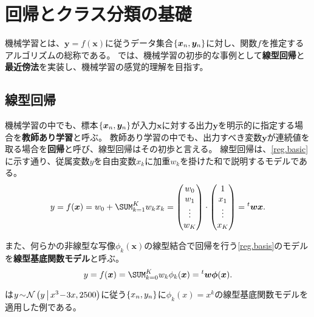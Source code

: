 \documentclass[10pt,a4paper]{book}
\begin{document}
\maketitle
\tableofcontents

\chapter{回帰とクラス分類の基礎\label{chap:intro}}

機械学習とは、$\bm{y}=f(\bm{x})$に従うデータ集合$\seq{\bm{x}_n,\bm{y}_n}$に対し、関数$f$を推定するアルゴリズムの総称である。
では、機械学習の初歩的な事例として\textbf{線型回帰}と\textbf{最近傍法}を実装し、機械学習の感覚的理解を目指す。

\section{線型回帰\label{sect:intro.reg}}

機械学習の中でも、標本$\seq{\bm{x}_n,\bm{y}_n}$が入力$\bm{x}$に対する出力$\bm{y}$を明示的に指定する場合を\textbf{教師あり学習}と呼ぶ。
教師あり学習の中でも、出力すべき変数$\bm{y}$が連続値を取る場合を\textbf{回帰}と呼び、線型回帰はその初歩と言える。
線型回帰は、\eqref{reg.basic}に示す通り、従属変数$y$を自由変数$x_k$に加重$w_k$を掛けた和で説明するモデルである。
%
\begin{equation}
\label{eq:reg.basic}
y = f(\bm{x}) = w_0 + \sum_{k=1}^K w_k x_k
= \begin{pmatrix} w_0 \\ w_1 \\ \vdots \\ w_K\end{pmatrix} \cdot \begin{pmatrix} 1 \\ x_1 \\ \vdots \\ x_K\end{pmatrix}
= \trans{\bm{w}} \bm{x}.
\end{equation}

また、何らかの非線型な写像$\phi_k(\bm{x})$の線型結合で回帰を行う\eqref{reg.basis}のモデルを\textbf{線型基底関数モデル}と呼ぶ。
%
\begin{equation}
\label{eq:reg.basis}
y = f(\bm{x}) = \sum_{k=0}^K w_k \phi_k(\bm{x}) = \trans{\bm{w}}\bm{\phi}(\bm{x}).
\end{equation}

は$y\!\sim\!\mathcal{N}\left(y\,\middle|\,x^3\!-\!3x,2500\right)$に従う$\seq{x_n,y_n}$に$\phi_k(x)\!=\!x^k$の線型基底関数モデルを適用した例である。
\end{document}
